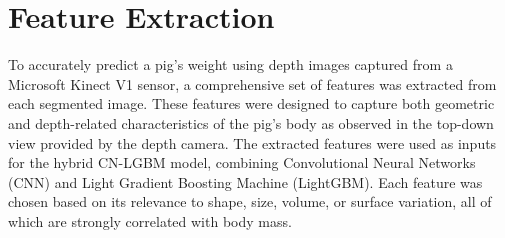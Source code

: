 {\section{Feature Extraction} \label{Section 3.7}

To accurately predict a pig’s weight using depth images captured from a Microsoft Kinect V1 sensor, a comprehensive set of features was extracted from each segmented image. These features were designed to capture both geometric and depth-related characteristics of the pig’s body as observed in the top-down view provided by the depth camera. The extracted features were used as inputs for the hybrid CN-LGBM model, combining Convolutional Neural Networks (CNN) and Light Gradient Boosting Machine (LightGBM). Each feature was chosen based on its relevance to shape, size, volume, or surface variation, all of which are strongly correlated with body mass.

}
